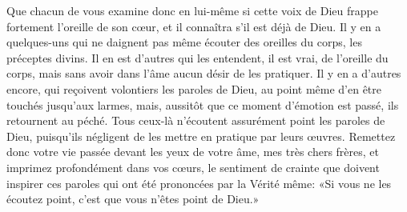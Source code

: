  Que chacun de vous examine donc en lui-même
	si cette voix de Dieu frappe fortement l’oreille de son cœur,
	et il connaîtra s’il est déjà de Dieu.
Il y en a quelques-uns qui ne daignent pas même écouter des oreilles du corps,
	les préceptes divins.
Il en est d’autres qui les entendent, il est vrai, de l’oreille du corps,
	mais sans avoir dans l’âme aucun désir de les pratiquer.
Il y en a d’autres encore, qui reçoivent volontiers les paroles de Dieu,
	au point même d’en être touchés jusqu’aux larmes,
	mais, aussitôt que ce moment d’émotion est passé, ils retournent au péché.
Tous ceux-là n’écoutent assurément point les paroles de Dieu,
	puisqu’ils négligent de les mettre en pratique par leurs œuvres.
Remettez donc votre vie passée devant les yeux de votre âme,
		mes très chers frères,
	et imprimez profondément dans vos cœurs,
	le sentiment de crainte que doivent inspirer ces paroles
	qui ont été prononcées par la Vérité même:
	«Si vous ne les écoutez point, c’est que vous n’êtes point de Dieu.»
